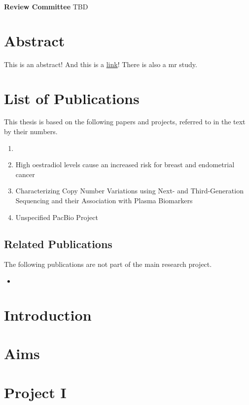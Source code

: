 \documentclass[]{scrbook}
\begin{document}
\textbf{Review Committee}
TBD

\printglossary[type=\acronymtype]

\printglossary

\chapter{Abstract}
    This is an abstract! And this is a \href{https://schmytzi.github.io/}{link}! There is also a \gls{mr} study.

\chapter{List of Publications}
This thesis is based on the following papers and projects, referred to in the text by their numbers.

\begin{enumerate}[label=\Roman*.]
    \item {}
    \item High oestradiol levels cause an increased risk for breast and endometrial cancer
    \item Characterizing Copy Number Variations using Next- and Third-Generation Sequencing and their Association with Plasma Biomarkers
    \item Unspecified PacBio Project
\end{enumerate}

\section*{Related Publications}
The following publications are not part of the main research project.
\begin{itemize}
    \item {}
\end{itemize}

\tableofcontents

\mainmatter
\parskip 0pt
\parindent \oldparindent
\chapter{Introduction}

\chapter{Aims}

\chapter{Project I}
\end{document}
